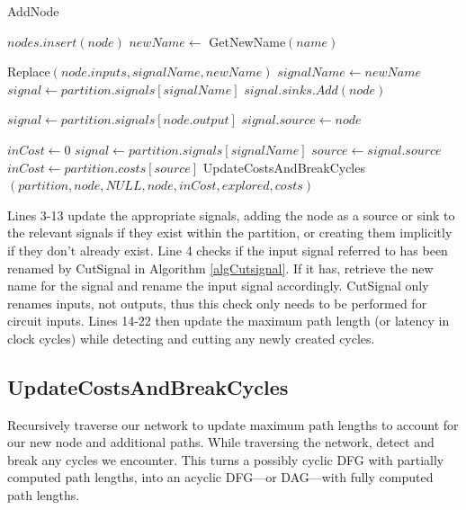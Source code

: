 \documentclass[12pt,final,oneside,a4paper]{dwThesis} %
\begin{document}
\begin{algorithm}
\begin{center}
      \end{center}

      \caption{AddNode}\label{addnode} 
      \begin{algorithmic}[1]
         \State $nodes.insert(node)$
           
         \State
         $newName \gets$ GetNewName$(name)$ 

         \State Replace$(node.inputs, signalName, newName)$  
         \State $signalName
         \gets newName$ \EndIf 
         \State $signal \gets
         partition.signals[signalName]$ 
         \State $signal.sinks.Add(node)$ \EndFor

         \State $signal \gets partition.signals[node.output]$ 
         \State
         $signal.source \gets node$


         \State $inCost \gets 0$  
         \State
         $signal \gets partition.signals[signalName]$ 
         \State $source \gets
         signal.source$  
         \State $inCost
         \gets partition.costs[source]$ \EndIf \EndFor 
         \State
         UpdateCostsAndBreakCycles$(partition, node, NULL, node, inCost,
         explored, costs)$ \EndProcedure 
      \end{algorithmic}

   \end{algorithm}

   Lines 3-13 update the appropriate signals, adding the node as a source or
   sink to the relevant signals if they exist within the partition, or creating them implicitly if they don't already exist.
   Line 4 checks if the input signal referred to has been renamed by CutSignal in Algorithm \ref{algCutsignal}.
   If it has, retrieve the new name for the signal and rename the input signal accordingly.
   CutSignal only renames inputs, not outputs, thus this check only needs to be performed for circuit inputs.
   Lines 14-22 then update the maximum path length (or latency in
   clock cycles) while detecting and cutting any newly created cycles.


   \newpage 
   \subsection{UpdateCostsAndBreakCycles}
   Recursively traverse our
   network to update maximum path lengths to account for our new node and
   additional paths. While traversing the network, detect and break any cycles
   we encounter.  This turns a possibly cyclic \gls{DFG} with partially
   computed path lengths, into an acyclic \gls{DFG}---or \gls{DAG}---with fully computed path
   lengths.
\end{document}
